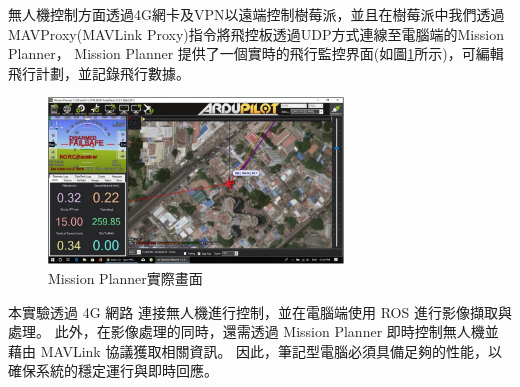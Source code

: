 \documentclass[12pt]{article}       %
\begin{document}
無人機控制方面透過4G網卡及VPN以遠端控制樹莓派，並且在樹莓派中我們透過MAVProxy(MAVLink Proxy)\cite{mavproxy_2023}指令將飛控板透過UDP方式連線至電腦端的Mission Planner\cite{pixhawk_2023}，
Mission Planner 提供了一個實時的飛行監控界面(如圖\ref{fig:missionplanner}所示)，可編輯飛行計劃，並記錄飛行數據。
\begin{figure}[H]
    \centering
    \includegraphics[width=0.7\textwidth]{missionplanner.jpg}     %
    \caption{Mission Planner實際畫面\cite{pixhawk_2023}}    %
    \label{fig:missionplanner}    %
\end{figure}
本實驗透過 4G 網路 連接無人機進行控制，並在電腦端使用 ROS 進行影像擷取與處理。
此外，在影像處理的同時，還需透過 Mission Planner 即時控制無人機並藉由 MAVLink 協議獲取相關資訊。
因此，筆記型電腦必須具備足夠的性能，以確保系統的穩定運行與即時回應。
\end{document}
